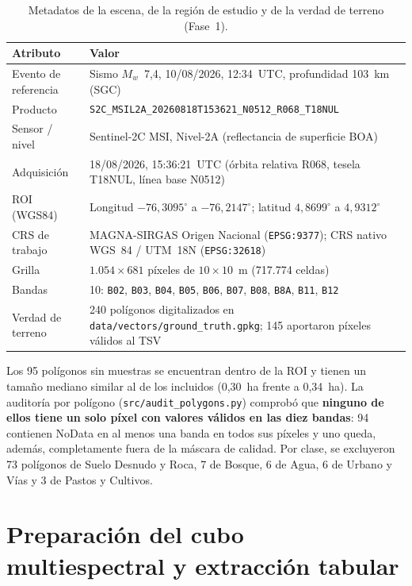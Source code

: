 \documentclass[11pt,a4paper]{article}
\begin{document}
\begin{table}[H]
\centering
\small
\begin{tabularx}{\textwidth}{l X}
\toprule
\textbf{Atributo} & \textbf{Valor} \\
\midrule
Evento de referencia & Sismo $M_w$~7,4, 10/08/2026, 12:34~UTC, profundidad 103~km (SGC)~\cite{sgc2026} \\
Producto & \texttt{S2C\_MSIL2A\_20260818T153621\_N0512\_R068\_T18NUL} \\
Sensor / nivel & Sentinel-2C MSI, Nivel-2A (reflectancia de superficie BOA) \\
Adquisición & 18/08/2026, 15:36:21~UTC (órbita relativa R068, tesela T18NUL, línea base N0512) \\
ROI (WGS84) & Longitud $-76{,}3095^\circ$ a $-76{,}2147^\circ$; latitud $4{,}8699^\circ$ a $4{,}9312^\circ$ \\
CRS de trabajo & MAGNA-SIRGAS Origen Nacional (\texttt{EPSG:9377}); CRS nativo WGS~84 / UTM~18N (\texttt{EPSG:32618}) \\
Grilla & $1.054 \times 681$ píxeles de $10 \times 10$~m (717.774 celdas) \\
Bandas & 10: \texttt{B02}, \texttt{B03}, \texttt{B04}, \texttt{B05}, \texttt{B06}, \texttt{B07}, \texttt{B08}, \texttt{B8A}, \texttt{B11}, \texttt{B12} \\
Verdad de terreno & 240 polígonos digitalizados en \texttt{data/vectors/ground\_truth.gpkg}; 145 aportaron píxeles válidos al TSV \\
\bottomrule
\end{tabularx}
\caption{Metadatos de la escena, de la región de estudio y de la verdad de terreno (Fase~1).}
\label{tab:metadatos}
\end{table}

Los 95 polígonos sin muestras se encuentran dentro de la ROI y tienen un tamaño mediano similar al de los incluidos (0,30~ha frente a 0,34~ha). La auditoría por polígono (\texttt{src/audit\_polygons.py}) comprobó que \textbf{ninguno de ellos tiene un solo píxel con valores válidos en las diez bandas}: 94 contienen NoData en al menos una banda en todos sus píxeles y uno queda, además, completamente fuera de la máscara de calidad. Por clase, se excluyeron 73 polígonos de Suelo Desnudo y Roca, 7 de Bosque, 6 de Agua, 6 de Urbano y Vías y 3 de Pastos y Cultivos.

\section{Preparación del cubo multiespectral y extracción tabular}
\end{document}
